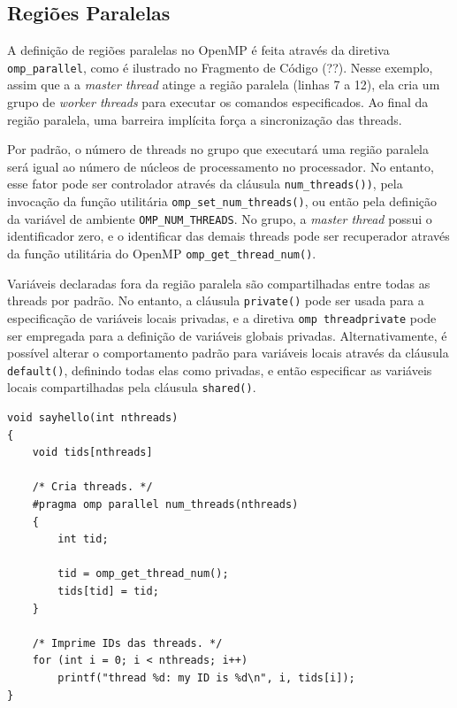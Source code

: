 \documentclass{SBCbookchapter}
\begin{document}
	\subsection{Regiões Paralelas}

		A definição de regiões paralelas no OpenMP é feita através da
		diretiva \texttt{omp\_parallel}, como é ilustrado no Fragmento de
		Código (??). Nesse exemplo, assim que a a \textit{master thread}
		atinge a região paralela (linhas 7 a 12), ela cria um grupo de
		\textit{worker threads} para executar os comandos especificados. Ao
		final da região paralela, uma barreira implícita força a
		sincronização das threads.
		
		Por padrão, o número de threads no grupo que executará uma região
		paralela será igual ao número de núcleos de processamento no
		processador. No entanto, esse fator pode ser controlador através da
		cláusula  \texttt{num\_threads())}, pela invocação da função
		utilitária \texttt{omp\_set\_num\_threads()}, ou então pela
		definição da variável de ambiente \texttt{OMP\_NUM\_THREADS}. No
		grupo, a \textit{master thread} possui o identificador zero, e o
		identificar das demais threads pode ser recuperador através da
		função utilitária do OpenMP \texttt{omp\_get\_thread\_num()}.

		Variáveis declaradas fora da região paralela são compartilhadas entre
		todas as threads por padrão. No entanto, a cláusula \texttt{private()}
		pode ser usada para a especificação de variáveis locais privadas, e a
		diretiva \texttt{omp threadprivate} pode ser empregada para a definição
		de variáveis globais privadas. Alternativamente, é possível alterar o
		comportamento padrão para variáveis locais através da cláusula
		\texttt{default()}, definindo todas elas como privadas, e então
		especificar	as variáveis locais compartilhadas pela cláusula
		\texttt{shared()}.

\begin{lstlisting}[frame=single]
void sayhello(int nthreads)
{
	void tids[nthreads]

	/* Cria threads. */
	#pragma omp parallel num_threads(nthreads)
	{
		int tid;

		tid = omp_get_thread_num();
		tids[tid] = tid;
	}

	/* Imprime IDs das threads. */
	for (int i = 0; i < nthreads; i++)
		printf("thread %d: my ID is %d\n", i, tids[i]);
}
\end{lstlisting}
\end{document}
